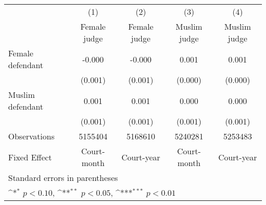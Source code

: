 {
\def\sym#1{\ifmmode^{#1}\else\(^{#1}\)\fi}
\begin{tabular}{l*{4}{c}}
\hline\hline
                    &\multicolumn{1}{c}{(1)}&\multicolumn{1}{c}{(2)}&\multicolumn{1}{c}{(3)}&\multicolumn{1}{c}{(4)}\\
                    &\multicolumn{1}{c}{Female judge}&\multicolumn{1}{c}{Female judge}&\multicolumn{1}{c}{Muslim judge}&\multicolumn{1}{c}{Muslim judge}\\
\hline
Female defendant    &      -0.000         &      -0.000         &       0.001         &       0.001         \\
                    &     (0.001)         &     (0.001)         &     (0.000)         &     (0.000)         \\
[1em]
Muslim defendant    &       0.001         &       0.001         &       0.000         &       0.000         \\
                    &     (0.001)         &     (0.001)         &     (0.001)         &     (0.001)         \\
\hline
Observations        &     5155404         &     5168610         &     5240281         &     5253483         \\
Fixed Effect        & Court-month         &  Court-year         & Court-month         &  Court-year         \\
\hline\hline
\multicolumn{5}{l}{\footnotesize Standard errors in parentheses}\\
\multicolumn{5}{l}{\footnotesize \sym{*} \(p<0.10\), \sym{**} \(p<0.05\), \sym{***} \(p<0.01\)}\\
\end{tabular}
}
